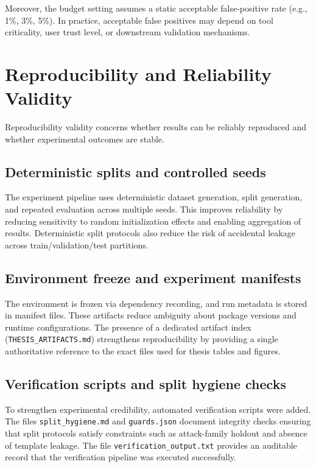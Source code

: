 Moreover, the budget setting assumes a static acceptable false-positive rate (e.g., 1\%, 3\%, 5\%). In practice, acceptable false positives may depend on tool criticality, user trust level, or downstream validation mechanisms.

\section{Reproducibility and Reliability Validity}
\label{subsec:reproducibility_validity}

Reproducibility validity concerns whether results can be reliably reproduced and whether experimental outcomes are stable.

\subsection{Deterministic splits and controlled seeds}
The experiment pipeline uses deterministic dataset generation, split generation, and repeated evaluation across multiple seeds. This improves reliability by reducing sensitivity to random initialization effects and enabling aggregation of results. Deterministic split protocols also reduce the risk of accidental leakage across train/validation/test partitions.

\subsection{Environment freeze and experiment manifests}
The environment is frozen via dependency recording, and run metadata is stored in manifest files. These artifacts reduce ambiguity about package versions and runtime configurations. The presence of a dedicated artifact index (\texttt{THESIS\_ARTIFACTS.md}) strengthens reproducibility by providing a single authoritative reference to the exact files used for thesis tables and figures.

\subsection{Verification scripts and split hygiene checks}
To strengthen experimental credibility, automated verification scripts were added. The files \texttt{split\_hygiene.md} and \texttt{guards.json} document integrity checks ensuring that split protocols satisfy constraints such as attack-family holdout and absence of template leakage. The file \texttt{verification\_output.txt} provides an auditable record that the verification pipeline was executed successfully.

